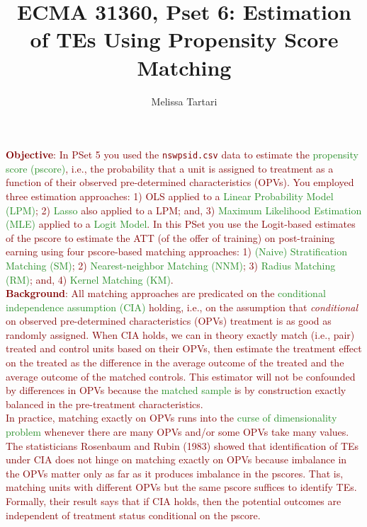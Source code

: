 \documentclass{article}
\newcommand{\psetnum}{6}
\begin{document}

\title{ECMA 31360, Pset \psetnum: Estimation of TEs Using Propensity Score Matching}
\date{}
\author{Melissa Tartari}
\maketitle
\thispagestyle{fancy}

\noindent \textcolor{Maroon}{\textbf{Objective}: In PSet 5 you used the \texttt{nswpsid.csv} data to estimate the \textcolor{ForestGreen}{propensity score (pscore)}, i.e., the probability that a unit is assigned to treatment as a function of their observed pre-determined characteristics (OPVs). You employed three estimation approaches: 1) OLS applied to a \textcolor{ForestGreen}{Linear Probability Model (LPM)}; 2) \textcolor{ForestGreen}{Lasso} also applied to a LPM; and, 3) \textcolor{ForestGreen}{Maximum Likelihood Estimation (MLE)} applied to a \textcolor{ForestGreen}{Logit Model}. In this PSet you use the Logit-based estimates of the pscore to estimate the ATT (of the offer of training) on post-training earning using four pscore-based matching approaches: 1) \textcolor{ForestGreen}{(Naive) Stratification Matching (SM)}; 2) \textcolor{ForestGreen}{Nearest-neighbor Matching (NNM)}; 3) \textcolor{ForestGreen}{Radius Matching (RM)}; and, 4) \textcolor{ForestGreen}{Kernel Matching (KM)}.} \\


\noindent \textcolor{Maroon}{\textbf{Background}: All matching approaches are predicated on the \textcolor{ForestGreen}{conditional independence assumption (CIA)} holding, i.e., on the assumption that \textit{conditional} on observed pre-determined characteristics (OPVs) treatment is as good as randomly assigned. When CIA holds, we can in theory exactly match (i.e., pair) treated and control units based on their OPVs, then estimate the treatment effect on the treated as the difference in the average outcome of the treated and the average outcome of the matched controls. This estimator will not be confounded by differences in OPVs because the \textcolor{ForestGreen}{matched sample} is by construction exactly balanced in the pre-treatment characteristics.} \\

\noindent \textcolor{Maroon}{In practice, matching exactly on OPVs runs into the \textcolor{ForestGreen}{curse of dimensionality problem} whenever there are many OPVs and/or some OPVs take many values. The statisticians Rosenbaum and Rubin (1983) showed that identification of TEs under CIA does not hinge on matching exactly on OPVs because imbalance in the OPVs matter only as far as it produces imbalance in the pscores. That is, matching units with different OPVs but the same pscore suffices to identify TEs. Formally, their result says that if CIA holds, then the potential outcomes are independent of treatment status conditional on the pscore.} \\
\end{document}
